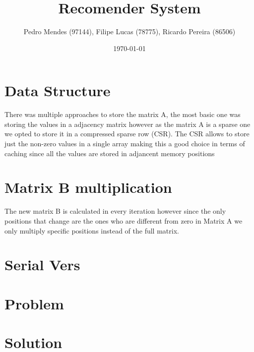 \documentclass[a4paper]{article}
\begin{document}
\title{Recomender System}
\author{Pedro Mendes (97144), Filipe Lucas (78775), Ricardo Pereira (86506)}
\date{\today}
\maketitle

\section{Data Structure}
There was multiple approaches to store the matrix A, the most basic one was storing the values in a adjacency matrix however as the matrix A is a sparse one we opted to store it in a compressed sparse row (CSR). The CSR allows to store just the non-zero values in a single array making this a good choice in terms of caching since all the values are stored in adjancent memory positions

\section{Matrix B multiplication}
The new matrix B is calculated in every iteration however since the only positions that change are the ones who are different from zero in Matrix A we only multiply specific positions instead of the full matrix.
\section{Serial Vers}

\section{Problem}

\section{Solution}



\end{document}
